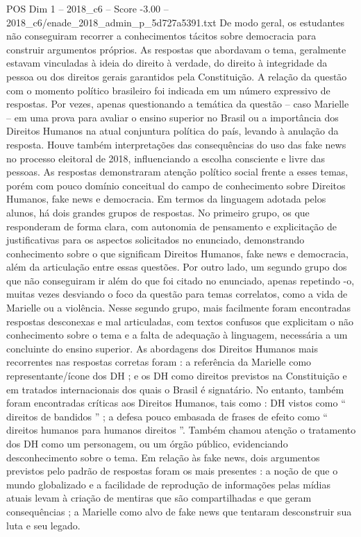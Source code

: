 \begin{textsample}{POS Dim 1 – 2018\_c6 – Score -3.00 – 2018\_c6/enade\_2018\_admin\_p\_5d727a5391.txt}
De modo geral, os estudantes não conseguiram recorrer a conhecimentos tácitos sobre democracia para construir argumentos próprios.
As respostas que abordavam o tema, geralmente estavam vinculadas à ideia do direito à verdade, do direito à integridade da pessoa ou dos direitos gerais garantidos pela Constituição.
A relação da questão com o momento político brasileiro foi indicada em um número expressivo de respostas.
Por vezes, apenas questionando a temática da questão – caso Marielle – em uma prova para avaliar o ensino superior no Brasil ou a importância dos Direitos Humanos na atual conjuntura política do país, levando à anulação da resposta.
Houve também interpretações das consequências do uso das fake news no processo eleitoral de 2018, influenciando a escolha consciente e livre das pessoas.
As respostas demonstraram atenção político social frente a esses temas, porém com pouco domínio conceitual do campo de conhecimento sobre Direitos Humanos, fake news e democracia.
Em termos da linguagem adotada pelos alunos, há dois grandes grupos de respostas.
No primeiro grupo, os que responderam de forma clara, com autonomia de pensamento e explicitação de justificativas para os aspectos solicitados no enunciado, demonstrando conhecimento sobre o que significam Direitos Humanos, fake news e democracia, além da articulação entre essas questões.
Por outro lado, um segundo grupo dos que não conseguiram ir além do que foi citado no enunciado, apenas repetindo -o, muitas vezes desviando o foco da questão para temas correlatos, como a vida de Marielle ou a violência.
Nesse segundo grupo, mais facilmente foram encontradas respostas desconexas e mal articuladas, com textos confusos que explicitam o não conhecimento sobre o tema e a falta de adequação à linguagem, necessária a um concluinte do ensino superior.
As abordagens dos Direitos Humanos mais recorrentes nas respostas corretas foram : a referência da Marielle como representante/ícone dos DH ; e os DH como direitos previstos na Constituição e em tratados internacionais dos quais o Brasil é signatário.
No entanto, também foram encontradas críticas aos Direitos Humanos, tais como : DH vistos como “ direitos de bandidos ” ; a defesa pouco embasada de frases de efeito como “ direitos humanos para humanos direitos ”.
Também chamou atenção o tratamento dos DH como um personagem, ou um órgão público, evidenciando desconhecimento sobre o tema.
Em relação às fake news, dois argumentos previstos pelo padrão de respostas foram os mais presentes : a noção de que o mundo globalizado e a facilidade de reprodução de informações pelas mídias atuais levam à criação de mentiras que são compartilhadas e que geram consequências ; a Marielle como alvo de fake news que tentaram desconstruir sua luta e seu legado.

\end{textsample}
